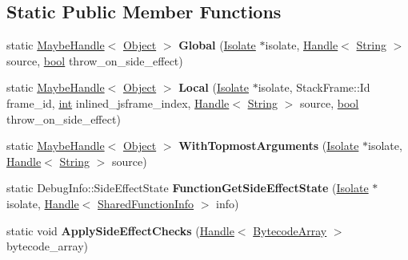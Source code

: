 \subsection*{Static Public Member Functions}
\begin{DoxyCompactItemize}
\item 
\mbox{\label{classv8_1_1internal_1_1DebugEvaluate_a6377a1add4bb2ac7e1ac3a12e53c1640}} 
static \mbox{\hyperlink{classv8_1_1internal_1_1MaybeHandle}{Maybe\+Handle}}$<$ \mbox{\hyperlink{classv8_1_1internal_1_1Object}{Object}} $>$ {\bfseries Global} (\mbox{\hyperlink{classv8_1_1internal_1_1Isolate}{Isolate}} $\ast$isolate, \mbox{\hyperlink{classv8_1_1internal_1_1Handle}{Handle}}$<$ \mbox{\hyperlink{classv8_1_1internal_1_1String}{String}} $>$ source, \mbox{\hyperlink{classbool}{bool}} throw\+\_\+on\+\_\+side\+\_\+effect)
\item 
\mbox{\label{classv8_1_1internal_1_1DebugEvaluate_ac1aef27d7d3302b7b028847140d648f0}} 
static \mbox{\hyperlink{classv8_1_1internal_1_1MaybeHandle}{Maybe\+Handle}}$<$ \mbox{\hyperlink{classv8_1_1internal_1_1Object}{Object}} $>$ {\bfseries Local} (\mbox{\hyperlink{classv8_1_1internal_1_1Isolate}{Isolate}} $\ast$isolate, Stack\+Frame\+::\+Id frame\+\_\+id, \mbox{\hyperlink{classint}{int}} inlined\+\_\+jsframe\+\_\+index, \mbox{\hyperlink{classv8_1_1internal_1_1Handle}{Handle}}$<$ \mbox{\hyperlink{classv8_1_1internal_1_1String}{String}} $>$ source, \mbox{\hyperlink{classbool}{bool}} throw\+\_\+on\+\_\+side\+\_\+effect)
\item 
\mbox{\label{classv8_1_1internal_1_1DebugEvaluate_a898e66fb925d288494c5cac4074a6d2e}} 
static \mbox{\hyperlink{classv8_1_1internal_1_1MaybeHandle}{Maybe\+Handle}}$<$ \mbox{\hyperlink{classv8_1_1internal_1_1Object}{Object}} $>$ {\bfseries With\+Topmost\+Arguments} (\mbox{\hyperlink{classv8_1_1internal_1_1Isolate}{Isolate}} $\ast$isolate, \mbox{\hyperlink{classv8_1_1internal_1_1Handle}{Handle}}$<$ \mbox{\hyperlink{classv8_1_1internal_1_1String}{String}} $>$ source)
\item 
\mbox{\label{classv8_1_1internal_1_1DebugEvaluate_a937274b8943f97597ff7cf75804dd54c}} 
static Debug\+Info\+::\+Side\+Effect\+State {\bfseries Function\+Get\+Side\+Effect\+State} (\mbox{\hyperlink{classv8_1_1internal_1_1Isolate}{Isolate}} $\ast$isolate, \mbox{\hyperlink{classv8_1_1internal_1_1Handle}{Handle}}$<$ \mbox{\hyperlink{classv8_1_1internal_1_1SharedFunctionInfo}{Shared\+Function\+Info}} $>$ info)
\item 
\mbox{\label{classv8_1_1internal_1_1DebugEvaluate_a52a06a68665c0ba15ebffb40fe2cea15}} 
static void {\bfseries Apply\+Side\+Effect\+Checks} (\mbox{\hyperlink{classv8_1_1internal_1_1Handle}{Handle}}$<$ \mbox{\hyperlink{classv8_1_1internal_1_1BytecodeArray}{Bytecode\+Array}} $>$ bytecode\+\_\+array)
\end{DoxyCompactItemize}


